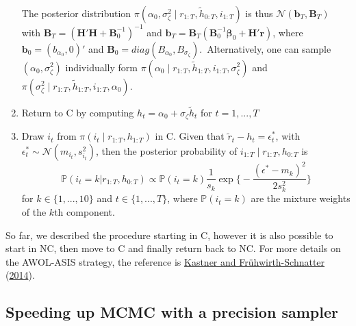 \documentclass[
  12pt,
]{book}
\theoremstyle{break}
\theoremstyle{nonumberplain}
\begin{document}
\begin{enumerate}
The posterior distribution $\pi(\alpha_0,\sigma^{2}_{\zeta}\mid r_{1:T},\tilde{h}_{0:T},i_{1:T})$ is thus $\mathcal{N}(\boldsymbol{b}_{T},\boldsymbol{B}_{T})$ with $\boldsymbol{B}_{T}=(\boldsymbol{H}'\boldsymbol{H}+\boldsymbol{B}_{0}^{-1})^{-1}$ and $\boldsymbol{b}_{T}=\boldsymbol{B}_{T}(\boldsymbol{B}^{-1}_{0}\boldsymbol{\beta}_{0}+\boldsymbol{H}'\boldsymbol{r})$, where $\boldsymbol{b}_{0}=(b_{\alpha_0},0)'$ and $\boldsymbol{B}_{0}=diag(B_{\alpha_0},B_{\sigma_\zeta})$.\
Alternatively, one can sample $(\alpha_0,\sigma^2_\zeta)$ individually form $\pi(\alpha_0\mid r_{1:T},\tilde{h}_{1:T},i_{1:T},\sigma^2_\zeta)$ and $\pi(\sigma^2_\zeta\mid r_{1:T},\tilde{h}_{1:T},i_{1:T},\alpha_0)$.
\item Return to C by computing $h_{t}=\alpha_{0}+\sigma_\zeta \tilde{h}_t$ for $t=1,...,T$
\item Draw $i_t$ from $\pi(i_{t}\mid r_{1:T},h_{1:T})$ in C. Given that $\tilde{r}_{t}-h_{t}=\epsilon^{*}_{t}$, with $\epsilon^{*}_{t}\sim\mathcal{N}(m_{i_t},s^{2}_{i_t})$, then the posterior probability of $i_{1:T}\mid r_{1:T},h_{0:T}$ is 
\[
\mathbb{P}(i_{t}=k|r_{1:T},h_{0:T}) \propto \mathbb{P}(i_t=k)\frac{1}{s_k}\exp\bigg\{-\frac{(\epsilon^{*}-m_{k})^2}{2s_{k}^2}\bigg\}
\]
for $k \in \{1,...,10\}$ and $t \in \{1,...,T\}$, where $\mathbb{P}(i_t=k)$ are the mixture weights of the $k$th component.
\end{enumerate}

So far, we described the procedure starting in C, however it is also
possible to start in NC, then move to C and finally return back to NC.
For more details on the AWOL-ASIS strategy, the reference is
\protect\hyperlink{ref-KASTNER2014408}{Kastner and Frühwirth-Schnatter}
(\protect\hyperlink{ref-KASTNER2014408}{2014}).

\subsection{Speeding up MCMC with a precision sampler}\label{Sparse Matrix}
\end{document}
